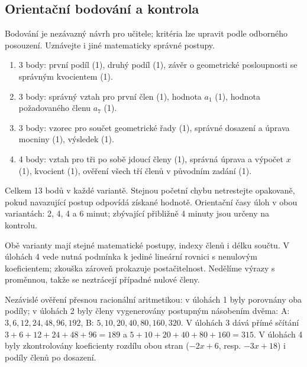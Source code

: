 \documentclass[a4paper,10pt]{article}
\begin{document}
\subsection*{Orientační bodování a kontrola}
Bodování je nezávazný návrh pro učitele; kritéria lze upravit podle
odborného posouzení. Uznávejte i jiné matematicky správné postupy.
\begin{enumerate}
\item 3 body: první podíl (1), druhý podíl (1), závěr o geometrické
posloupnosti se správným kvocientem (1).
\item 3 body: správný vztah pro první člen (1), hodnota $a_1$ (1),
hodnota požadovaného členu $a_7$ (1).
\item 3 body: vzorec pro součet geometrické řady (1), správné dosazení
a úprava mocniny (1), výsledek (1).
\item 4 body: vztah pro tři po sobě jdoucí členy (1), správná úprava
a výpočet $x$ (1), kvocient (1), ověření všech tří členů v původním zadání (1).
\end{enumerate}
Celkem 13 bodů v každé variantě. Stejnou početní chybu netrestejte opakovaně,
pokud navazující postup odpovídá získané hodnotě.
Orientační časy úloh v obou variantách: 2, 4, 4 a 6 minut;
zbývající přibližně 4 minuty jsou určeny na kontrolu.

Obě varianty mají stejné matematické postupy, indexy členů i délku součtu.
V úlohách 4 vede nutná podmínka k jediné lineární rovnici s nenulovým
koeficientem; zkouška zároveň prokazuje postačitelnost.
Nedělíme výrazy s proměnnou, takže se neztrácejí případné nulové členy.

Nezávislé ověření přesnou racionální aritmetikou: v úlohách 1 byly
porovnány oba podíly; v úlohách 2 byly členy vygenerovány postupným
násobením dvěma: A: $3,6,12,24,48,96,192$,
B: $5,10,20,40,80,160,320$.
V úlohách 3 dává přímé sčítání
$3+6+12+24+48+96=189$ a $5+10+20+40+80+160=315$.
V úlohách 4 byly zkontrolovány koeficienty rozdílu obou stran
($-2x+6$, resp. $-3x+18$) i podíly členů po dosazení.
\end{document}
